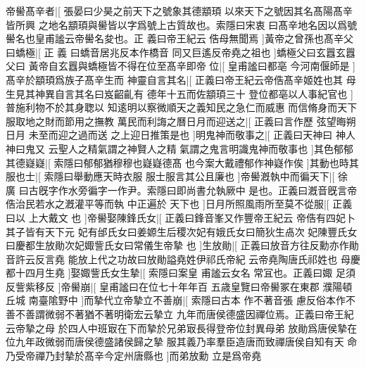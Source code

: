 帝嚳髙辛者|[%
張晏曰少昊之前天下之號象其德顓頊%
以來天下之號因其名髙陽髙辛皆所興%
%
之地名顓頊與嚳皆以字爲號上古質故也。索隱曰宋衷%
曰髙辛地名因以爲號嚳名也皇甫謐云帝嚳名夋也。正%
%
義曰帝王紀云%
俈母無聞焉%
]黃帝之曾孫也髙辛父曰蟜極|[%
正%
義%
%
曰蟜音居兆反本作橋音%
同又巨遙反帝堯之祖也%
]蟜極父曰玄囂玄囂父曰%
%
黃帝自玄囂與蟜極皆不得在位至髙辛即帝%
%
位|[%
皇甫謐曰都亳%
今河南偃師是%
]髙辛於顓頊爲族子髙辛生而%
%
神靈自言其名|[%
正義曰帝王紀云帝俈髙辛姬姓也其%
母生見其神異自言其名曰岌齠齓有%
%
德年十五而佐顓頊三十%
登位都亳以人事紀官也%
]普施利物不於其身聦以%
%
知逺明以察微順天之義知民之急仁而威惠%
%
而信脩身而天下服取地之財而節用之撫教%
%
萬民而利誨之曆日月而迎送之|[%
正義曰言作歷%
弦望晦朔日月%
%
未至而迎之過而送%
之上迎日推策是也%
]明鬼神而敬事之|[%
正義曰天神曰%
神人神曰鬼又%
%
云聖人之精氣謂之神賢人之精%
氣謂之鬼言明識鬼神而敬事也%
]其色郁郁其德嶷嶷|[%
%
索隱曰郁郁猶穆穆也嶷嶷德髙%
也今案大戴禮郁作神嶷作俟%
]其動也時其服也士|[%
%
索隱曰舉動應天時衣服%
服士服言其公且廉也%
]帝嚳漑執中而徧天下|[%
徐%
廣%
%
曰古旣字作水旁徧字一作尹。索隱曰即尚書允執厥中%
是也。正義曰漑音旣言帝俈治民若水之漑灌平等而執%
%
中正遍於%
天下也%
]日月所照風雨所至莫不從服|[%
正義曰以%
上大戴文%
%
也%
]帝嚳娶陳鋒氏女|[%
正義曰鋒音峯又作豐帝王紀云%
帝俈有四妃卜其子皆有天下元%
%
妃有邰氏女曰姜嫄生后稷次妃有娥氏女曰簡狄生卨次%
妃陳豐氏女曰慶都生放勛次妃娵訾氏女曰常儀生帝摯%
%
也%
]生放勛|[%
正義曰放音方往反勳亦作勛音許云反言堯%
能放上代之功故曰放勛謚堯姓伊祁氏帝紀%
%
云帝堯陶唐氏祁姓也%
母慶都十四月生堯%
]娶娵訾氏女生摯|[%
索隱曰案皇%
甫謐云女名%
%
常冝也。正義曰娵%
足須反訾紫移反%
]帝嚳崩|[%
皇甫謐曰在位七十年年百%
五歳皇覽曰帝嚳冢在東郡%
%
濮陽頓丘城%
南臺隂野中%
]而摯代立帝摯立不善崩|[%
索隱曰古本%
作不著音張%
%
慮反俗本作不善不善謂微弱不著猶不著明衛宏云摯立%
九年而唐侯德盛因禪位焉。正義曰帝王紀云帝摯之母%
%
於四人中班㝡在下而摯於兄弟㝡長得登帝位封異母弟%
放勛爲唐侯摯在位九年政微弱而唐侯德盛諸侯歸之摯%
%
服其義乃率羣臣造唐而致禪唐侯自知有天%
命乃受帝禪乃封摯於髙辛今定州唐縣也%
]而弟放勳%
%
立是爲帝堯%
